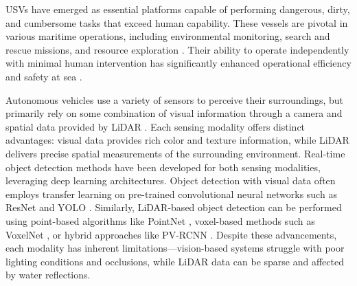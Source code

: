 \documentclass{erauthesis}
\begin{document}




\acp{USV} have emerged as essential platforms capable of performing dangerous, dirty, and cumbersome tasks that exceed human capability. These vessels are pivotal in various maritime operations, including environmental monitoring, search and rescue missions, and resource exploration \cite{liebergall, eckstein2024}.%
Their ability to operate independently with minimal human intervention has significantly enhanced operational efficiency and safety at sea \cite{bai2022}.%

Autonomous vehicles use a variety of sensors to perceive their surroundings, but primarily rely on some combination of visual information through a camera and spatial data provided by \ac{LiDAR} \cite{yeong2021}.%
Each sensing modality offers distinct advantages: visual data provides rich color and texture information, while \ac{LiDAR} delivers precise spatial measurements of the surrounding environment.
Real-time object detection methods have been developed for both sensing modalities, leveraging deep learning architectures.
Object detection with visual data often employs transfer learning on pre-trained convolutional neural networks such as ResNet \cite{he2016} and \ac{YOLO} \cite{ultralytics}.%
Similarly, \ac{LiDAR}-based object detection can be performed using point-based algorithms like PointNet \cite{garcia-garcia2016}, voxel-based methods such as VoxelNet \cite{zhou2018a}, or hybrid approaches like PV-RCNN \cite{shi2021}.%
Despite these advancements, each modality has inherent limitations—vision-based systems struggle with poor lighting conditions and occlusions, while \ac{LiDAR} data can be sparse and affected by water reflections.
\end{document}
